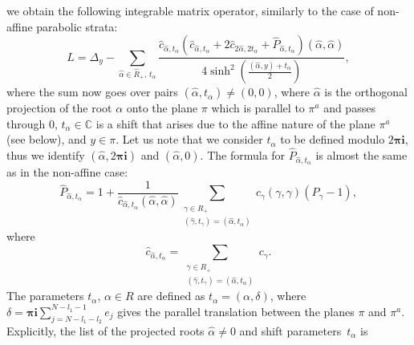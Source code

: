 \documentclass[12pt]{amsart}
\numberwithin{equation}{section}
\theoremstyle{definition}
\begin{document}
we obtain the following integrable matrix operator, similarly to the case of non-affine parabolic strata:
\begin{equation}
\label{BCL}
    L = \Delta_y - \sum\limits_{\widehat{\alpha} \in \widehat{R}_+, \, t_{\alpha}} \frac{\widehat{c}_{\widehat{\alpha},t_{\alpha}}(\widehat{c}_{\widehat{\alpha}, t_{\alpha}} + 2 \widehat{c}_{2\widehat{\alpha}, 2t_{\alpha}} + \widehat{P}_{\widehat{\alpha}, t_{\alpha}}) (\widehat{\alpha}, \widehat{\alpha})}{4\sinh^2(\frac{(\widehat{\alpha},y) + t_{\alpha}}{2})}, 
\end{equation}
where the sum now goes over pairs $(\widehat{\alpha}, t_{\alpha}) \neq (0,0)$, where $\widehat{\alpha}$ is the orthogonal projection of the root $\alpha$ onto the plane $\pi$ which is parallel to $\pi^a$ and passes through $0$,  $t_{\alpha}\in \mathbb C$ is a shift that arises due to the affine nature of the plane $\pi^a$ (see below), and $y \in \pi$. Let us note that we consider $t_{\alpha}$ to be defined modulo $2 \boldsymbol{\pi} \boldsymbol{i}$, thus we identify $(\widehat{\alpha}, 2\boldsymbol{\pi} \boldsymbol{i})$ and $( \widehat{\alpha}, 0)$. The formula for $\widehat{P}_{\widehat{\alpha}, t_{\alpha}}$ is almost the same as in the non-affine case:
\begin{equation*}
    \widehat{P}_{\widehat{\alpha}, t_{\alpha}} = 1 + \frac{1}{\widehat{c}_{\widehat{\alpha}, t_{\alpha}} (\widehat{\alpha}, \widehat{\alpha})} \sum_{\substack{ \gamma \in R_+ \\(\widehat{\gamma}, t_{\gamma}) = (\widehat{\alpha}, t_{\alpha})}} 
    c_{\gamma}(\gamma, \gamma) (P_{\gamma} - 1),
\end{equation*}
where
\begin{equation*}
    \widehat{c}_{\widehat{\alpha}, t_{\alpha}} = \sum\limits_{\substack{\gamma \in R_+  \\ (\widehat{\gamma}, t_{\gamma}) = (\widehat{\alpha}, t_{\alpha})}} c_{\gamma}.
\end{equation*}
The parameters $t_\alpha$, $\alpha \in R$ are defined as $t_\alpha=(\alpha, \delta)$, where $\delta =  \boldsymbol{\pi} \boldsymbol{i} \sum_{j=N - l_1 - l_2}^{N- l_1 - 1}  e_j$ gives the parallel translation between the planes $\pi$ and $\pi^a$. 
Explicitly, the list of the projected roots $\widehat{\alpha} \neq 0$ and shift parameters~$t_{\alpha}$ is
\end{document}

